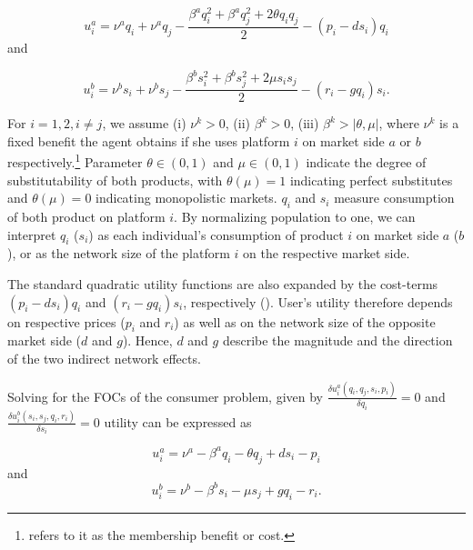 \documentclass[12pt,a4paper]{scrreprt}
\begin{document}
\begin{equation}\label{4.1}
u_i^a = \nu^a q_i + \nu^a q_j-\frac{\beta^a q^2_i+ \beta^a q^2_j+ 2 \theta q_i q_j}{2}-(p_i-d s_i)q_i
\end{equation} and 

\begin{equation}\label{4.2}
u_i^b = \nu^b s_i + \nu^b s_j -\frac{\beta^b s^2_i+ \beta^b s^2_j+2 \mu s_i s_j}{2}-(r_i-g q_i)s_i.
\end{equation}

For $i=1,2, i \neq j$, we assume (i) $\nu^k > 0$, (ii) $\beta^k > 0$, (iii) $\beta^k>\vert\theta,\mu\vert$, where $\nu^k$ is a fixed benefit the agent obtains if she uses platform $i$ on market side $a$ or $b$ respectively.\footnote{\cite{weyl_price_2010} refers to it as the membership benefit or cost.} Parameter $\theta \in (0,1)$ and $\mu \in (0,1)$ indicate the degree of substitutability of both products, with $\theta (\mu) = 1$ indicating perfect substitutes and $\theta (\mu) = 0$ indicating monopolistic markets. $q_i$ and $s_i$ measure consumption of both product on platform $i$. By normalizing  population to one, we can interpret $q_i$ ($s_i$) as each individual’s consumption of product $i$ on market side $a$ ($b$), or as the network size of the platform $i$ on the respective market side.

The standard quadratic utility functions are also expanded by the cost-terms $(p_i-d s_i)q_i$ and $(r_i-g q_i)s_i$, respectively (\cite{kind_business_2009}). User's utility therefore depends on respective prices ($p_i$ and $r_i$) as well as on the network size of the opposite market side ($d$ and $g$). Hence, $d$ and $g$ describe the magnitude and the direction of the two indirect network effects. 

Solving for the FOCs of the consumer problem, given by $\frac{\delta u_i^a(q_i,q_j,s_i,p_i)}{\delta q_i}=0$ and  $\frac{\delta u_i^b(s_i,s_j,q_i,r_i)}{\delta s_i}=0$ utility can be expressed as

\begin{equation}\label{utility_a}
u_i^a = \nu^a-\beta^a q_i - \theta q_j +ds_i - p_i
\end{equation}
and
\begin{equation}\label{utility_b}
u_i^b=\nu^b-\beta^b s_i - \mu s_j +gq_i - r_i.
\end{equation} 
\end{document}
